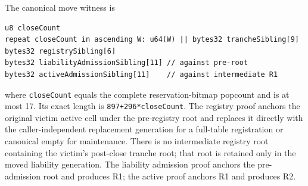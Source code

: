\documentclass[a4paper,11pt]{article}
\newcommand{\code}[1]{\nolinkurl{#1}}
\begin{document}
The canonical move witness is
\begin{verbatim}
u8 closeCount
repeat closeCount in ascending W: u64(W) || bytes32 trancheSibling[9]
bytes32 registrySibling[6]
bytes32 liabilityAdmissionSibling[11] // against pre-root
bytes32 activeAdmissionSibling[11]    // against intermediate R1
\end{verbatim}
where \code{closeCount} equals the complete reservation-bitmap popcount and is
at most 17.  Its exact length is \code{897+296*closeCount}.  The registry proof
anchors the original victim active cell under the pre-registry root and replaces
it directly with the caller-independent replacement generation for a full-table
registration or canonical empty for maintenance.  There is no intermediate
registry root containing the victim's post-close tranche root; that root is
retained only in the moved liability generation.  The liability admission proof anchors the
pre-admission root and produces R1; the active proof anchors R1 and produces
R2.
\end{document}
